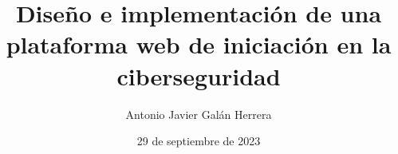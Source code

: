 \title[Plataforma web de iniciación en la ciberseguridad]
{Diseño e implementación de una plataforma web de iniciación en la ciberseguridad}

\author{Antonio Javier Galán Herrera}


\date{29 de septiembre de 2023}
